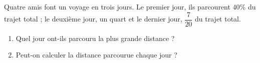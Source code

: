 
\begin{exercice}\label{exo2smath-0025}

    Quatre amis font un voyage en trois jours. Le premier jour, ils parcourent $40$\% du trajet total ; le deuxième jour, un quart et le dernier jour, \( \dfrac{ 7 }{ 20 }\) du trajet total. 

    \begin{enumerate}
        \item
 Quel jour ont-ils parcouru la plus grande distance ?
\item
Peut-on calculer la distance parcourue chaque jour ?
    \end{enumerate}

\end{exercice}
